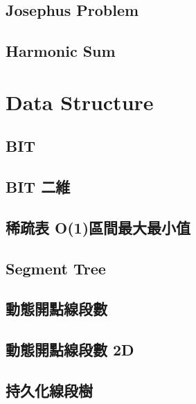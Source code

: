 \subsection{Josephus Problem}


\subsection{Harmonic Sum}


\section{Data Structure}

\subsection{BIT}


\subsection{BIT 二維}


\subsection{稀疏表 O(1)區間最大最小值}


\subsection{Segment Tree}


\subsection{動態開點線段數}


\subsection{動態開點線段數 2D}


\subsection{持久化線段樹}


